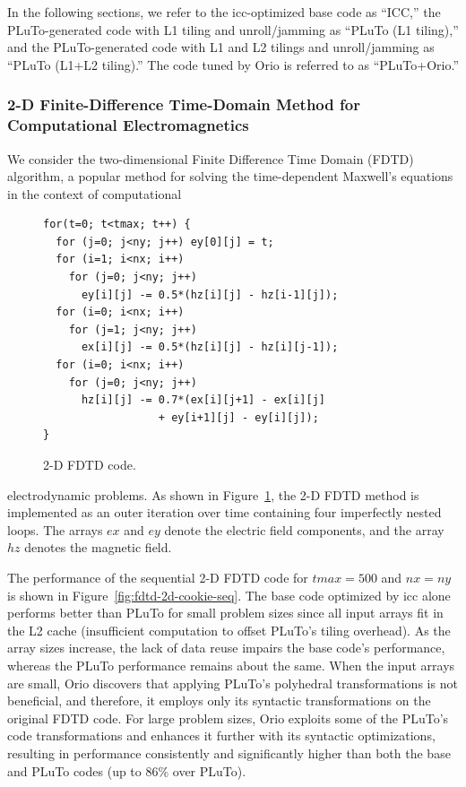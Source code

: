 In the following sections, we refer to the icc-optimized base code as
``ICC,'' the PLuTo-generated code with L1 tiling and
unroll/jamming as ``PLuTo (L1 tiling),'' and the PLuTo-generated code with L1
and L2 tilings and unroll/jamming as ``PLuTo (L1+L2 tiling).'' The code
tuned by Orio is referred to as ``PLuTo+Orio.''
 
\subsubsection{2-D Finite-Difference Time-Domain Method for Computational Electromagnetics}  
We consider the two-dimensional Finite Difference Time Domain (FDTD) algorithm, a
popular method for solving the time-dependent Maxwell's equations in the
context of computational 
%
\begin{figure}
\vspace{-0.2in}
\begin{center}
\begin{minipage}{3in} 
\scriptsize
\begin{verbatim} 
for(t=0; t<tmax; t++) { 
  for (j=0; j<ny; j++) ey[0][j] = t; 
  for (i=1; i<nx; i++) 
    for (j=0; j<ny; j++) 
      ey[i][j] -= 0.5*(hz[i][j] - hz[i-1][j]); 
  for (i=0; i<nx; i++) 
    for (j=1; j<ny; j++) 
      ex[i][j] -= 0.5*(hz[i][j] - hz[i][j-1]); 
  for (i=0; i<nx; i++) 
    for (j=0; j<ny; j++) 
      hz[i][j] -= 0.7*(ex[i][j+1] - ex[i][j]
                  + ey[i+1][j] - ey[i][j]); 
} 
\end{verbatim} 
\end{minipage} 
\end{center}
\vspace{-0.2in}
\caption{2-D FDTD code.} 
\label{fig:fdtd-2d-code} 
\vspace{-.1in}
\end{figure}
%
electrodynamic problems. As shown in Figure~\ref{fig:fdtd-2d-code}, the 2-D
FDTD method is implemented as an outer iteration over time containing four imperfectly
nested loops.  The arrays $ex$ and $ey$ denote the electric field components,
and the array $hz$ denotes the magnetic field.

The performance of the sequential 2-D FDTD code for $tmax=500$ and $nx=ny$ is
shown in Figure~\ref{fig:fdtd-2d-cookie-seq}. The base code optimized by icc
alone performs better than PLuTo for small problem sizes since all input
arrays fit in the L2 cache (insufficient computation to offset PLuTo's tiling
overhead). As the array sizes increase, the lack of data reuse impairs the
base code's performance, whereas the PLuTo performance remains about the
same.
When the input arrays are small, Orio discovers that applying
PLuTo's polyhedral transformations is not beneficial, and therefore,
it employs only its syntactic transformations on the original FDTD
code. For large problem sizes, Orio exploits some of the PLuTo's code
transformations and enhances it further with its syntactic
optimizations, resulting in performance consistently and significantly
higher than both the base and PLuTo codes (up to 86\% over PLuTo).


